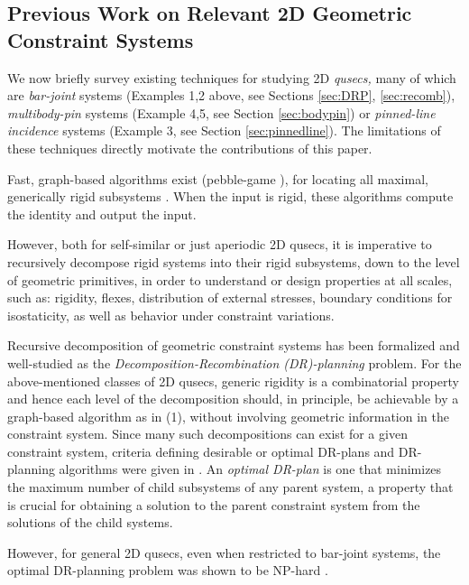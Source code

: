 \subsection{Previous Work on Relevant 2D Geometric Constraint Systems} We
now briefly survey existing techniques for studying 2D {\em qusecs,}  many
of which are {\it bar-joint} systems (Examples 1,2 above, see Sections
\ref{sec:DRP}, \ref{sec:recomb}),
{\it multibody-pin} systems (Example 4,5, see Section \ref{sec:bodypin}) or  {\it
pinned-line incidence} systems (Example 3, see Section \ref{sec:pinnedline}). The
limitations of these techniques directly motivate
the contributions of this paper.

\medskip\noindent{}
Fast, graph-based algorithms exist (pebble-game \cite{XX}),
for locating all maximal, generically rigid subsystems \cite{XX}.
When the input is rigid, these algorithms compute the identity and  output
the input.

However, both for self-similar or just aperiodic 2D qusecs, it is
imperative to recursively decompose rigid systems
into their rigid subsystems, down to the level of
geometric primitives, in order to
understand or design properties at all scales, such as:
rigidity, flexes, distribution
of external stresses, boundary conditions for isostaticity,
as well as behavior under constraint variations.

\medskip\noindent{}
Recursive decomposition of geometric constraint systems has been
formalized \cite{XX} and well-studied \cite{XX}
as the {\sl Decomposition-Recombination (DR)-planning} problem.
For the above-mentioned classes of 2D qusecs, generic rigidity is
a combinatorial property and hence each level of the decomposition should,
in principle, be achievable by a graph-based algorithm as in (1), without
involving geometric information in the constraint system.
Since many  such decompositions can exist for a given constraint system,
criteria defining desirable or optimal DR-plans and DR-planning algorithms
were given in \cite{XX}. An {\em optimal DR-plan} is one
that minimizes the maximum number of child subsystems of any parent
system, a property that is
crucial for obtaining a solution to the parent constraint system from the
solutions of the child systems.

However, for general 2D qusecs, even when restricted to bar-joint systems,
the optimal DR-planning problem was shown to be NP-hard \cite{XX}.

